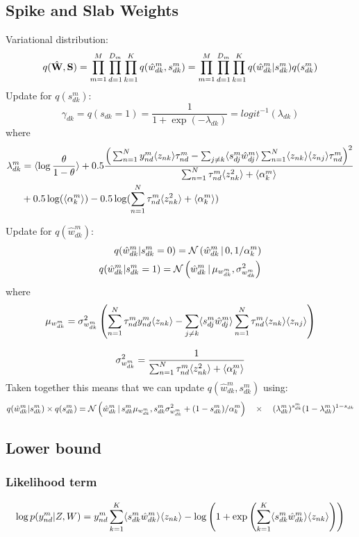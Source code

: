\documentclass[10pt, a4paper,openany]{report}
\begin{document}
\subsection*{Spike and Slab Weights}
Variational distribution:
\[
q(\hat{{\bf W}},{\bf S}) = \prod_{m=1}^{M} \prod_{d=1}^{D_m} \prod_{k=1}^{K} q(\hat{w}_{dk}^m,s_{dk}^m) = \prod_{m=1}^{M} \prod_{d=1}^{D_m} \prod_{k=1}^{K} q(\hat{w}_{dk}^m|s_{dk}^m)q(s_{dk}^m)
\]
Update for $q(s_{dk}^m)$:
\[
\gamma_{dk} = q(s_{dk}=1) = \frac{1}{1+\exp(-\lambda_{dk})} =logit^{-1}(\lambda_{dk})
\]
where
\begin{align*}
\lambda_{dk}^m &= \langle \log\frac{\theta}{1-\theta} \rangle + 0.5 \frac{ \Big( \sum_{n=1}^{N} y_{nd}^m \langle z_{nk} \rangle \tau_{nd}^m- \sum_{j \neq k} \langle s_{dj}^m\hat{w}_{dj}^m\rangle \sum_{n=1}^{N} \langle z_{nk} \rangle \langle z_{nj} \rangle \tau_{nd}^m\Big)^2}{\sum_{n=1}^N \tau_{nd}^m  \langle z_{nk}^2\rangle +\langle\alpha_k^m\rangle}\\
 &+ 0.5 \log(\langle\alpha_k^m\rangle) - 0.5 \log(\sum_{n=1}^N \tau_{nd}^m  \langle z_{nk}^2\rangle +\langle\alpha_k^m\rangle)
\end{align*}

Update for $q(\hat{w}_{dk}^m)$:
\begin{align*}
q(\hat{w}_{dk}^m|s_{dk}^m=0) = \mathcal{N}\left(\hat{w}_{dk}^m \,|\, 0,1/\alpha_k^m\right) \\
q(\hat{w}_{dk}^m|s_{dk}^m=1) = \mathcal{N}\left(\hat{w}_{dk}^m \,|\, \mu_{w_{dk}^m},\sigma_{w_{dk}^m}^2\right)
\end{align*}
where
\[
\mu_{w_{dk}^m} = \sigma^2_{w_{dk}^m} \left(\sum_{n=1}^N  \tau_{nd}^m  y_{nd}^m \langle z_{nk} \rangle -  \sum_{j \neq k} \langle s_{dj}^m\hat{w}_{dj}^m \rangle\sum_{n=1}^N  \tau_{nd}^m \langle z_{nk} \rangle \langle z_{nj} \rangle \right)
\]

\[
\sigma^2_{w_{dk}^m} = \frac{1 } { \sum_{n=1}^{N} \tau_{nd}^m \langle z_{nk}^2 \rangle + \langle\alpha_k^m\rangle}
\]
Taken together this means that we can update $q(\hat{w}_{dk}^m,s_{dk}^m)$ using:
\[
q(\hat{w}_{dk}^m|s_{dk}^m) \times q(s_{dk}^m) = \mathcal{N}\left( \hat{w}_{dk}^m  \,|\,  s_{dk}^m \mu_{w_{dk}^m}, s_{dk}^m\sigma_{w_{dk}^m}^2 + (1-s_{dk}^m)/\alpha_k^m\right) \quad \times \quad (\lambda_{dk}^m)^{s_{dk}^m} (1-\lambda_{dk}^m)^{1-s_{dk}}
\]


\subsection{Lower bound}

\subsubsection{Likelihood term}

\[
\log p(y^m_{nd}|Z,W)=y^m_{nd}\sum_{k=1}^{K}\langle s_{dk}^m \hat{w}_{dk}^m \rangle \langle z_{nk} \rangle - \log\left(1+\exp\left(\sum_{k=1}^{K}\langle s_{dk}^m \hat{w}_{dk}^m \rangle \langle z_{nk}\rangle\right)\right)
\]
\end{document}

